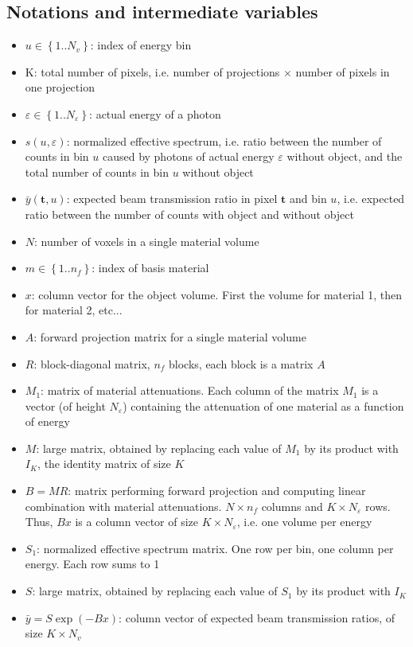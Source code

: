 \documentclass[a4paper, 10pt]{article}
\begin{document}
\subsection{Notations and intermediate variables}
\begin{itemize}
  \item $u \in \left\lbrace1..N_v\right\rbrace$: index of energy bin
  \item K: total number of pixels, i.e. number of projections $\times$ number of pixels in one projection
  \item $\varepsilon \in \left\lbrace1..N_\varepsilon \right\rbrace$: actual energy of a photon
  \item $s(u,\varepsilon)$: normalized effective spectrum, i.e. ratio between the number of counts in bin $u$ 
  caused by photons of actual energy $\varepsilon$ without object, and the total number of counts in bin $u$ without object
  \item $\bar{y}(\pmb{t},u)$: expected beam transmission ratio in pixel $\pmb{t}$ and bin $u$, i.e. expected ratio between the number of
  counts with object and without object
  \item $N$: number of voxels in a single material volume
  \item $m \in \left\lbrace1..n_f \right\rbrace$: index of basis material
  \item $x$: column vector for the object volume. First the volume for material 1, then for material 2, etc...
  \item $A$: forward projection matrix for a single material volume
  \item $R$: block-diagonal matrix, $n_f$ blocks, each block is a matrix $A$
  \item $M_1$: matrix of material attenuations. Each column of the matrix $M_1$ is a vector (of height $N_\varepsilon$) 
  containing the attenuation of one material as a function of energy
  \item $M$: large matrix, obtained by replacing each value of $M_1$ by its product with $I_K$, the identity matrix of size $K$
  \item $B=MR$: matrix performing forward projection and computing linear combination with material attenuations.
  $N \times n_f$ columns and $K \times N_\varepsilon$ rows. Thus, $Bx$ is a column vector of size $K \times N_\varepsilon$, 
  i.e. one volume per energy
  \item $S_1$: normalized effective spectrum matrix. One row per bin, one column per energy. Each row sums to 1
  \item $S$: large matrix, obtained by replacing each value of $S_1$ by its product with $I_K$
  \item $\bar{y} = S \exp(-Bx)$: column vector of expected beam transmission ratios, of size $K \times N_v$
\end{itemize}
\end{document}
